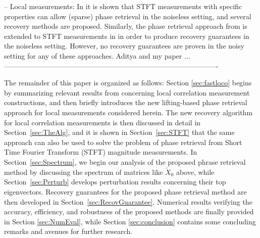 -- Local measurements:  In \cite{eldar2014sparse,jaganathan2015stft} it is shown that STFT measurements with specific properties can allow (sparse) phase retrieval in the noiseless setting, and several recovery methods are proposed.  Similarly, the phase retrieval approach from \cite{alexeev2014phase} is extended to STFT measurements in \cite{salanevich2015polarization} in order to produce recovery guarantees in the noiseless setting. However, no recovery guarantees are proven in the noisy setting for any of these approaches.  Aditya and my paper \cite{IVW2015_FastPhase}...\\


-------------------------------------------------------------------------------------------

The remainder of this paper is organized as follows: Section
\ref{sec:fastloco} begins by summarizing relevant results from
\cite{IVW2015_FastPhase} concerning local
correlation measurement constructions, and then briefly introduces the new lifting-based phase retrieval approach for local measurements considered herein.  
The new recovery algorithm for local
correlation measurements is then discussed in detail in Section~\ref{sec:TheAlg}, and it is shown in Section~\ref{sec:STFT} that the same approach can also be 
used to solve the problem of phase retrieval from Short Time Fourier Transform (STFT) magnitude measurements. In Section~\ref{sec:Spectrum}, we begin
our analysis of the proposed phrase retrieval method by discussing the
spectrum of matrices like $\widetilde X_0$ above, while Section~\ref{sec:Perturb} develops perturbation results concerning their top eigenvectors.  Recovery guarantees for the proposed phase
retrieval method are then developed in Section~\ref{sec:RecovGuarantee}. Numerical results verifying the accuracy,
efficiency, and robustness of the proposed methods are finally provided in
Section \ref{sec:NumEval}, while Section \ref{sec:conclusion} contains
some concluding remarks and avenues for further research.

